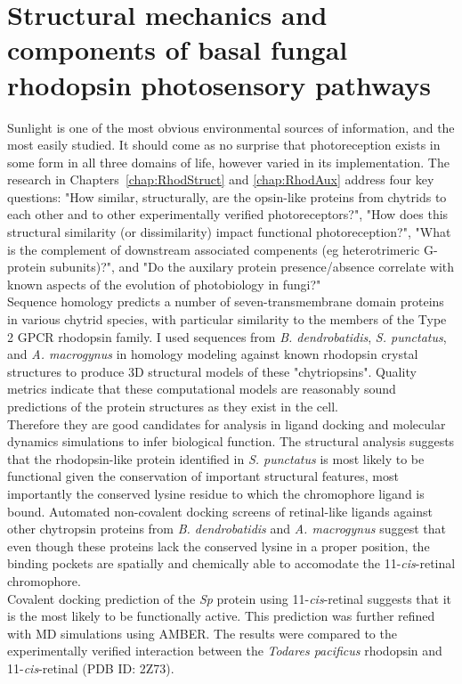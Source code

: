 \section{Structural mechanics and components of basal fungal rhodopsin photosensory pathways}
Sunlight is one of the most obvious environmental sources of information, and the most easily studied. It should come as no surprise that photoreception exists in some form in all three domains of life, however varied in its implementation. The research in Chapters~\ref{chap:RhodStruct} and \ref{chap:RhodAux} address four key questions: "How similar, structurally, are the opsin-like proteins from chytrids to each other and to other experimentally verified photoreceptors?", "How does this structural similarity (or dissimilarity) impact functional photoreception?", "What is the complement of downstream associated compenents (eg heterotrimeric G-protein subunits)?", and "Do the auxilary protein presence/absence correlate with known aspects of the evolution of photobiology in fungi?" \\
\indent Sequence homology predicts a number of seven-transmembrane domain proteins in various chytrid species, with particular similarity to the members of the Type 2 GPCR rhodopsin family. I used sequences from \textit{B. dendrobatidis}, \textit{S. punctatus}, and \textit{A. macrogynus} in homology modeling against known rhodopsin crystal structures to produce 3D structural models of these "chytriopsins". Quality metrics indicate that these computational models are reasonably sound predictions of the protein structures as they exist in the cell.\\
\indent Therefore they are good candidates for analysis in ligand docking and molecular dynamics simulations to infer biological function. The structural analysis suggests that the rhodopsin-like protein identified in \textit{S. punctatus} is most likely to be functional given the conservation of important structural features, most importantly the conserved lysine residue to which the chromophore ligand is bound. Automated non-covalent docking screens of retinal-like ligands against other chytropsin proteins from \textit{B. dendrobatidis} and \textit{A. macrogynus} suggest that even though these proteins lack the conserved lysine in a proper position, the binding pockets are spatially and chemically able to accomodate the 11-\textit{cis}-retinal chromophore.\\
\indent Covalent docking prediction of the \textit{Sp} protein using 11-\textit{cis}-retinal suggests that it is the most likely to be functionally active. This prediction was further refined with MD simulations using AMBER. The results were compared to the experimentally verified interaction between the \textit{Todares pacificus} rhodopsin and 11-\textit{cis}-retinal (PDB ID: 2Z73). \\

